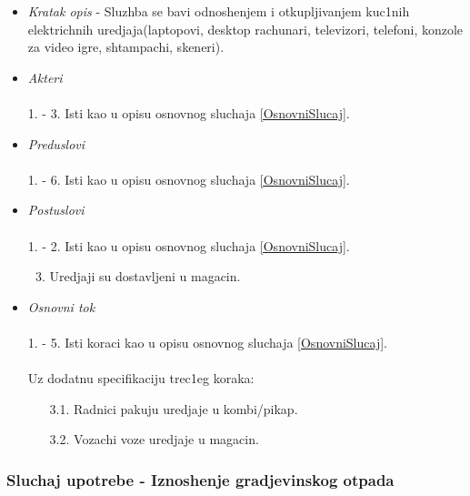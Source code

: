 \documentclass[10 pt]{article}
\begin{document}
		\begin{itemize}
			\item\textit{Kratak opis} - Sluzhba se bavi odnoshenjem i otkupljivanjem kuc1nih elektrichnih uredjaja(laptopovi, desktop rachunari, televizori, telefoni, konzole za video igre, shtampachi, skeneri).
			
			\item\textit{Akteri}\\\\ 
			1. - 3. Isti kao u opisu osnovnog sluchaja \ref{OsnovniSlucaj}. 
			
			\item\textit{Preduslovi}\\\\ 
			1. - 6. Isti kao u opisu osnovnog sluchaja \ref{OsnovniSlucaj}.
			
			\item\textit{Postuslovi}\\\\
			1. - 2. Isti kao u opisu osnovnog sluchaja \ref{OsnovniSlucaj}.
				\begin{enumerate}
					\setcounter{enumi}{2}
					\item Uredjaji su dostavljeni u magacin.
				\end{enumerate}
		
			\item\textit{Osnovni tok}\\\\
			1. - 5. Isti koraci kao u opisu osnovnog sluchaja \ref{OsnovniSlucaj}.\\\\
			Uz dodatnu specifikaciju trec1eg koraka:
			\begin{enumerate}
				\item [3.1.] Radnici pakuju uredjaje u kombi/pikap.
				\item [3.2.] Vozachi voze uredjaje u magacin.
			\end{enumerate}
			
		\end{itemize}
	
	\subsubsection{Sluchaj upotrebe - Iznoshenje gradjevinskog otpada}
		
\end{document}
